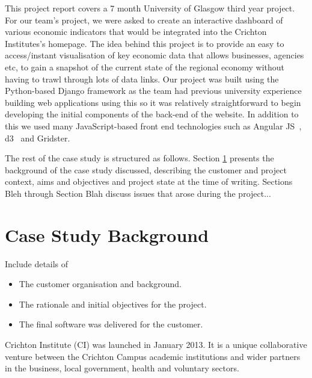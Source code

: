 \documentclass{l3proj}
\begin{document}
This project report covers a 7 month University of Glasgow third year project. For 
our team's project, we were asked to create an interactive dashboard of various 
economic indicators that would be integrated into the Crichton Institutes's homepage. The idea behind this project is to provide an easy to access/instant
visualisation of key economic data that allows businesses, agencies etc, to gain a snapshot of the current state of the
regional economy without having to trawl through lots of data links. Our project was built using the Python-based Django
framework as the team had previous university experience building web applications using this so it was relatively
straightforward to begin developing the initial components of the back-end of the website. In addition to this we used
many JavaScript-based front end technologies such as Angular JS~\cite{AngularWebpage}, d3~\cite{d3Webpage} and Gridster.



The rest of the case study is structured as follows.  Section
\ref{sec:background} presents the background of the case study
discussed, describing the customer and project context, aims and
objectives and project state at the time of writing.  Sections
Bleh through Section Blah discuss issues that
arose during the project...

\section{Case Study Background} \label{sec:background}

Include details of 

\begin{itemize}
\item The customer organisation and background.
\item The rationale and initial objectives for the project.
\item The final software was delivered for the customer.
\end{itemize}


Crichton Institute (CI) was launched in January 2013. It is a unique collaborative venture between the Crichton Campus academic
institutions and wider partners in the business, local government, health and voluntary sectors.
\end{document}
